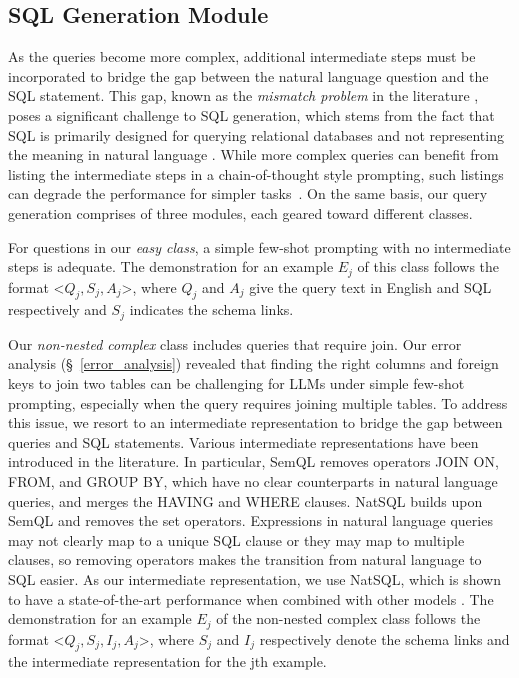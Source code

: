 \subsection{SQL Generation Module}
As the queries become more complex, additional intermediate steps must be incorporated to bridge the gap between the natural language question and the SQL statement. This gap, known as the \textit{mismatch problem} in the literature \citep{guo2019towards}, poses a significant challenge to SQL generation, which stems from the fact that SQL is primarily designed for querying relational databases and not representing the meaning in natural language \citep{kate2008transforming}.
While more complex queries can benefit from listing the intermediate steps in a chain-of-thought style prompting, such listings can degrade the performance for simpler tasks~\citep{wei2022chain}.
On the same basis, our query generation comprises of three modules, each geared toward different classes.

For questions in our \textit{easy class}, a simple few-shot prompting with no intermediate steps is adequate. The demonstration for an example $E_j$ of this class follows the format <$Q_{j} , S_{j}, A_{j}$>, where $Q_{j}$ and $A_{j}$ give the query text in English and SQL respectively and $S_{j}$ indicates the schema links.

Our \textit{non-nested complex} class includes queries that require join. Our error analysis (\S~\ref{error_analysis}) revealed that finding the right columns and foreign keys to join two tables can be challenging for LLMs under simple few-shot prompting, especially when the query requires joining multiple tables. To address this issue, we resort to an intermediate representation to bridge the gap between queries and SQL statements. Various intermediate representations have been introduced in the literature. In particular, SemQL \citep{guo2019towards} removes operators JOIN ON, FROM, and GROUP BY, which have no clear counterparts in natural language queries, and merges the HAVING and WHERE clauses. 
NatSQL \citep{gan2021natural} builds upon SemQL and removes the set operators. Expressions in natural language queries may not clearly map to a unique SQL clause or they may map to multiple clauses, so removing operators makes the transition from natural language to SQL easier.  As our intermediate representation, we use NatSQL, which is shown to have a state-of-the-art performance when combined with other models \citep{li2023decoupling}. The demonstration for an example $E_j$ of the non-nested complex class follows the format <$Q_{j}, S_{j}, I_{j}, A_{j}$>, where $S_{j}$ and $I_{j}$ respectively denote the schema links and the intermediate representation for the jth example.

